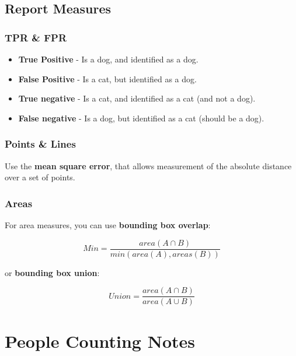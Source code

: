 \documentclass[english, 10pt]{article}
\begin{document}

\subsection{Report Measures}

\subsubsection{TPR \& FPR}

\begin{itemize}
\item \textbf{True Positive} - Is a dog, and identified as a dog. 
\item \textbf{False Positive} - Is a cat, but identified as a dog. 
\item \textbf{True negative} - Is a cat, and identified as a cat (and not a dog).
\item \textbf{False negative} - Is a dog, but identified as a cat (should be a dog).
\end{itemize}

\subsubsection{Points \& Lines}

Use the \textbf{mean square error}, that allows measurement of the absolute distance over a set of points. 

\subsubsection{Areas}

For area measures, you can use \textbf{bounding box overlap}:

$$Min = \frac{area(A \cap B)}{min(area(A), areas(B))}$$

or \textbf{bounding box union}:

$$Union = \frac{area(A \cap B)}{area(A \cup B)}$$

\section{People Counting Notes}
\end{document}
